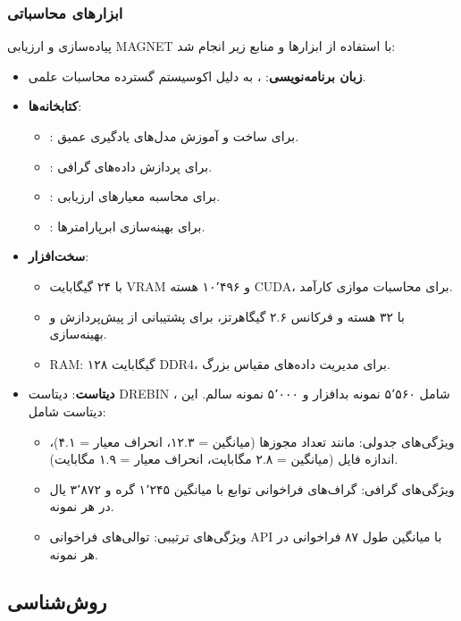 \subsubsection{ابزارهای محاسباتی}
پیاده‌سازی و ارزیابی MAGNET با استفاده از ابزارها و منابع زیر انجام شد:
\begin{itemize}
    \item \textbf{زبان برنامه‌نویسی}: ، به دلیل اکوسیستم گسترده محاسبات علمی.
    \item \textbf{کتابخانه‌ها}:
        \begin{itemize}
            \item {}: برای ساخت و آموزش مدل‌های یادگیری عمیق.
            \item {}: برای پردازش داده‌های گرافی.
            \item {}: برای محاسبه معیارهای ارزیابی.
            \item {}: برای بهینه‌سازی ابرپارامترها.
        \end{itemize}
    \item \textbf{سخت‌افزار}:
        \begin{itemize}
            \item {} با ۲۴ گیگابایت VRAM و ۱۰٬۴۹۶ هسته CUDA، برای محاسبات موازی کارآمد.
            \item {} با ۳۲ هسته و فرکانس ۲.۶ گیگاهرتز، برای پشتیبانی از پیش‌پردازش و بهینه‌سازی.
            \item RAM: ۱۲۸ گیگابایت DDR4، برای مدیریت داده‌های مقیاس بزرگ.
        \end{itemize}
    \item \textbf{دیتاست}: دیتاست DREBIN \cite{Drebin}، شامل ۵٬۵۶۰ نمونه بدافزار و ۵٬۰۰۰ نمونه سالم. این دیتاست شامل:
        \begin{itemize}
            \item ویژگی‌های جدولی: مانند تعداد مجوزها (میانگین = ۱۲.۳، انحراف معیار = ۴.۱)، اندازه فایل (میانگین = ۲.۸ مگابایت، انحراف معیار = ۱.۹ مگابایت).
            \item ویژگی‌های گرافی: گراف‌های فراخوانی توابع با میانگین ۱٬۲۴۵ گره و ۳٬۸۷۲ یال در هر نمونه.
            \item ویژگی‌های ترتیبی: توالی‌های فراخوانی API با میانگین طول ۸۷ فراخوانی در هر نمونه.
        \end{itemize}
\end{itemize}

\subsection{روش‌شناسی}

